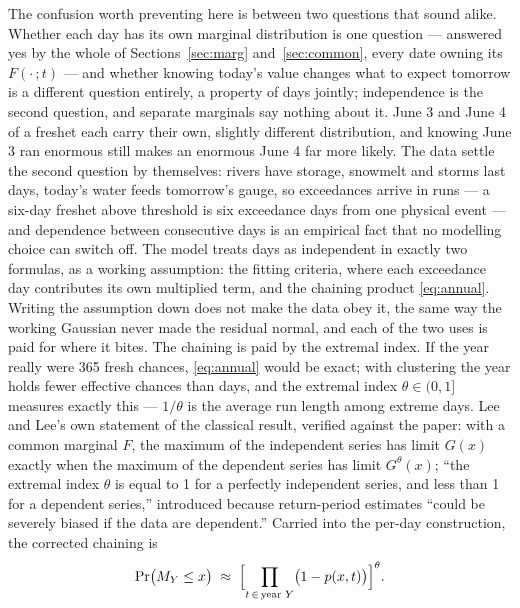 \documentclass[11pt]{article}
\begin{document}
{\color{blue}The confusion worth preventing here is between two questions that sound alike. Whether each day has its own marginal distribution is one question --- answered yes by the whole of Sections~\ref{sec:marg} and~\ref{sec:common}, every date owning its $F(\cdot\,; t)$ --- and whether knowing today's value changes what to expect tomorrow is a different question entirely, a property of days jointly; independence is the second question, and separate marginals say nothing about it. June 3 and June 4 of a freshet each carry their own, slightly different distribution, and knowing June 3 ran enormous still makes an enormous June 4 far more likely. The data settle the second question by themselves: rivers have storage, snowmelt and storms last days, today's water feeds tomorrow's gauge, so exceedances arrive in runs --- a six-day freshet above threshold is six exceedance days from one physical event --- and dependence between consecutive days is an empirical fact that no modelling choice can switch off. The model treats days as independent in exactly two formulas, as a working assumption: the fitting criteria, where each exceedance day contributes its own multiplied term, and the chaining product \eqref{eq:annual}. Writing the assumption down does not make the data obey it, the same way the working Gaussian never made the residual normal, and each of the two uses is paid for where it bites. The chaining is paid by the extremal index. If the year really were 365 fresh chances, \eqref{eq:annual} would be exact; with clustering the year holds fewer effective chances than days, and the extremal index $\theta \in (0, 1]$ measures exactly this --- $1/\theta$ is the average run length among extreme days. Lee and Lee's own statement of the classical result, verified against the paper: with a common marginal $F$, the maximum of the independent series has limit $G(x)$ exactly when the maximum of the dependent series has limit $G^{\theta}(x)$; ``the extremal index $\theta$ is equal to 1 for a perfectly independent series, and less than 1 for a dependent series,'' introduced because return-period estimates ``could be severely biased if the data are dependent.'' Carried into the per-day construction, the corrected chaining is
\begin{equation}\label{eq:theta}
\Pr\bigl(M_Y \le x\bigr) \;\approx\; \Bigl[\prod_{t\, \in\, \text{year } Y} \bigl(1 - p(x, t)\bigr)\Bigr]^{\theta}.
\end{equation}
}
\end{document}
